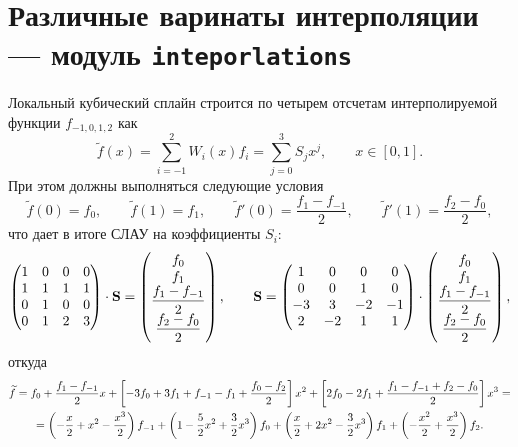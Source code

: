 \section{Различные варинаты интерполяции --- модуль {\tt inteporlations}}
Локальный кубический сплайн строится по четырем отсчетам интерполируемой функции $f_{-1,0,1,2}$
как
$$
\widetilde f(x) = \sum\limits_{i=-1}^2 W_i(x) f_i = \sum_{j=0}^3 S_j x^j, \qquad x\in[0,1].
$$
При этом должны выполняться следующие условия
$$
\widetilde f(0) = f_0, \qquad
\widetilde f(1) = f_1, \qquad
\widetilde f'(0)  = \frac{f_1-f_{-1}}2, \qquad
\widetilde f'(1)  = \frac{f_2-f_{0}}2, 
$$
что дает в итоге СЛАУ на коэффициенты $S_i$:
$$
\left(
\begin{matrix}
  1 & 0 & 0 & 0 \\
  1 & 1 & 1 & 1 \\
  0 & 1 & 0 & 0 \\
  0 & 1 & 2 & 3 \\
\end{matrix}
\right)\cdot {\bf S} = \left(
\begin{matrix}
f_0 \\ f_1 \\ \displaystyle\frac{f_1-f_{-1}}2 \\  \displaystyle\frac{f_2-f_{0}}2
\end{matrix}
\right),
\qquad
{\bf S} = \left(
\begin{matrix}
  1 & 0 & 0 & 0 \\
  0 & 0 & 1 & 0 \\
  -3 & 3 & -2 & -1 \\
  2 & -2 & 1 & 1 \\
\end{matrix}
\right)\cdot \left(
\begin{matrix}
f_0 \\ f_1 \\ \displaystyle\frac{f_1-f_{-1}}2 \\  \displaystyle\frac{f_2-f_{0}}2
\end{matrix}
\right),
$$
откуда
\begin{multline}
\widetilde f = f_0 + \frac{f_1-f_{-1}}2 x + \left[-3 f_0 + 3 f_1 + f_{-1} - f_1 + \frac{f_0-f_2}2 \right] x^2
+ \left[2f_0 -2f_1 + \frac{f_1 - f_{-1} + f_2-f_0}2 \right] x^3
=\\=
\left(-\frac x2 + x^2 -\frac{x^3}2\right)f_{-1}
+\left(1-\frac52 x^2+ \frac 32x^3\right)f_0
+\left(\frac x2 + 2x^2 - \frac32 x^3 \right)f_1
+\left(-\frac{x^2}2 + \frac{x^3}2 \right)f_2.
\notag
\end{multline}

